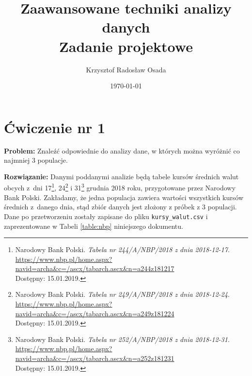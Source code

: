 \documentclass[12pt, a4paper]{article}
\title{Zaawansowane techniki analizy danych \\\Large Zadanie projektowe}
\author{Krzysztof Radosław Osada}
\date{\today}
\begin{document}
\maketitle

\section*{Ćwiczenie nr 1}

\begin{hangparas}{2.025cm}{1}
  \textbf{Problem:} Znaleźć odpowiednie do analizy dane, w których można wyróżnić co najmniej 3 populacje.\newline
\end{hangparas}

\begin{hangparas}{2.9cm}{1}
\textbf{Rozwiązanie:} Danymi poddanymi analizie będą tabele kursów średnich walut obcych z~dni 17\footnote{\noindent Narodowy Bank Polski. \textit{Tabela nr 244/A/NBP/2018 z dnia 2018-12-17}.\\\url{https://www.nbp.pl/home.aspx?navid=archa&c=/ascx/tabarch.ascx&n=a244z181217}\\Dostępny: 15.01.2019.}, 24\footnote{\noindent Narodowy Bank Polski. \textit{Tabela nr 249/A/NBP/2018 z dnia 2018-12-24}.\\\url{https://www.nbp.pl/home.aspx?navid=archa&c=/ascx/tabarch.ascx&n=a249z181224}\\Dostępny: 15.01.2019.} i 31\footnote{\noindent Narodowy Bank Polski. \textit{Tabela nr 252/A/NBP/2018 z dnia 2018-12-31}.\\\url{https://www.nbp.pl/home.aspx?navid=archa&c=/ascx/tabarch.ascx&n=a252z181231}\\Dostępny: 15.01.2019.} grudnia 2018 roku, przygotowane przez Narodowy Bank Polski. Zakładamy, że jedna populacja zawiera wartości wszystkich kursów średnich z~danego dnia, stąd zbiór danych jest złożony z próbek z 3 populacji.
\newline Dane po przetworzeniu zostały zapisane do pliku \texttt{kursy\_walut.csv} i zaprezentowane w Tabeli \ref{table:nbp} niniejszego dokumentu.
\end{hangparas}
\end{document}
